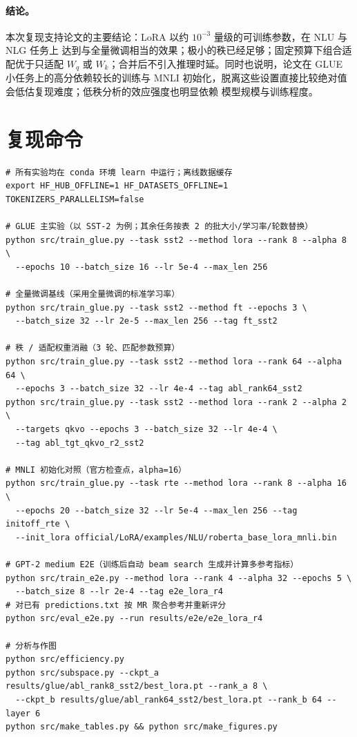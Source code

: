 \documentclass[11pt,a4paper]{ctexart}
\begin{document}
\paragraph{结论。}
本次复现支持论文的主要结论：LoRA 以约 $10^{-3}$ 量级的可训练参数，在 NLU 与 NLG 任务上
达到与全量微调相当的效果；极小的秩已经足够；固定预算下组合适配优于只适配 $W_q$ 或
$W_k$；合并后不引入推理时延。同时也说明，论文在 GLUE 小任务上的高分依赖较长的训练与
MNLI 初始化，脱离这些设置直接比较绝对值会低估复现难度；低秩分析的效应强度也明显依赖
模型规模与训练程度。

\appendix
\section{复现命令}
\begin{lstlisting}
# 所有实验均在 conda 环境 learn 中运行；离线数据缓存
export HF_HUB_OFFLINE=1 HF_DATASETS_OFFLINE=1 TOKENIZERS_PARALLELISM=false

# GLUE 主实验（以 SST-2 为例；其余任务按表 2 的批大小/学习率/轮数替换）
python src/train_glue.py --task sst2 --method lora --rank 8 --alpha 8 \
  --epochs 10 --batch_size 16 --lr 5e-4 --max_len 256

# 全量微调基线（采用全量微调的标准学习率）
python src/train_glue.py --task sst2 --method ft --epochs 3 \
  --batch_size 32 --lr 2e-5 --max_len 256 --tag ft_sst2

# 秩 / 适配权重消融（3 轮、匹配参数预算）
python src/train_glue.py --task sst2 --method lora --rank 64 --alpha 64 \
  --epochs 3 --batch_size 32 --lr 4e-4 --tag abl_rank64_sst2
python src/train_glue.py --task sst2 --method lora --rank 2 --alpha 2 \
  --targets qkvo --epochs 3 --batch_size 32 --lr 4e-4 \
  --tag abl_tgt_qkvo_r2_sst2

# MNLI 初始化对照（官方检查点，alpha=16）
python src/train_glue.py --task rte --method lora --rank 8 --alpha 16 \
  --epochs 20 --batch_size 32 --lr 5e-4 --max_len 256 --tag initoff_rte \
  --init_lora official/LoRA/examples/NLU/roberta_base_lora_mnli.bin

# GPT-2 medium E2E（训练后自动 beam search 生成并计算多参考指标）
python src/train_e2e.py --method lora --rank 4 --alpha 32 --epochs 5 \
  --batch_size 8 --lr 2e-4 --tag e2e_lora_r4
# 对已有 predictions.txt 按 MR 聚合参考并重新评分
python src/eval_e2e.py --run results/e2e/e2e_lora_r4

# 分析与作图
python src/efficiency.py
python src/subspace.py --ckpt_a results/glue/abl_rank8_sst2/best_lora.pt --rank_a 8 \
  --ckpt_b results/glue/abl_rank64_sst2/best_lora.pt --rank_b 64 --layer 6
python src/make_tables.py && python src/make_figures.py
\end{lstlisting}
\end{document}
